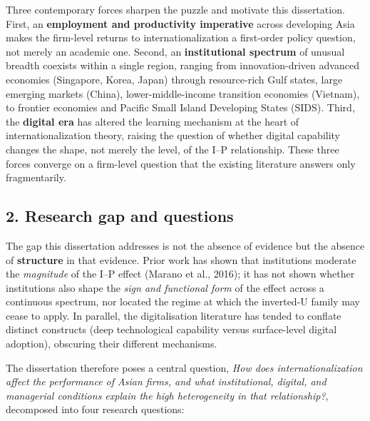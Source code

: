 \documentclass[
  a4paper,
  13pt]{extreport}
\begin{document}
Three contemporary forces sharpen the puzzle and motivate this
dissertation. First, an \textbf{employment and productivity imperative}
across developing Asia makes the firm-level returns to
internationalization a first-order policy question, not merely an
academic one. Second, an \textbf{institutional spectrum} of unusual
breadth coexists within a single region, ranging from innovation-driven
advanced economies (Singapore, Korea, Japan) through resource-rich Gulf
states, large emerging markets (China), lower-middle-income transition
economies (Vietnam), to frontier economies and Pacific Small Island
Developing States (SIDS). Third, the \textbf{digital era} has altered
the learning mechanism at the heart of internationalization theory,
raising the question of whether digital capability changes the shape,
not merely the level, of the I--P relationship. These three forces
converge on a firm-level question that the existing literature answers
only fragmentarily.

\hypertarget{research-gap-and-questions}{%
\subsection{2. Research gap and
questions}\label{research-gap-and-questions}}

The gap this dissertation addresses is not the absence of evidence but
the absence of \textbf{structure} in that evidence. Prior work has shown
that institutions moderate the \emph{magnitude} of the I--P effect
(Marano et al., 2016); it has not shown whether institutions also shape
the \emph{sign and functional form} of the effect across a continuous
spectrum, nor located the regime at which the inverted-U family may
cease to apply. In parallel, the digitalisation literature has tended to
conflate distinct constructs (deep technological capability versus
surface-level digital adoption), obscuring their different mechanisms.

The dissertation therefore poses a central question, \emph{How does
internationalization affect the performance of Asian firms, and what
institutional, digital, and managerial conditions explain the high
heterogeneity in that relationship?}, decomposed into four research
questions:
\end{document}

